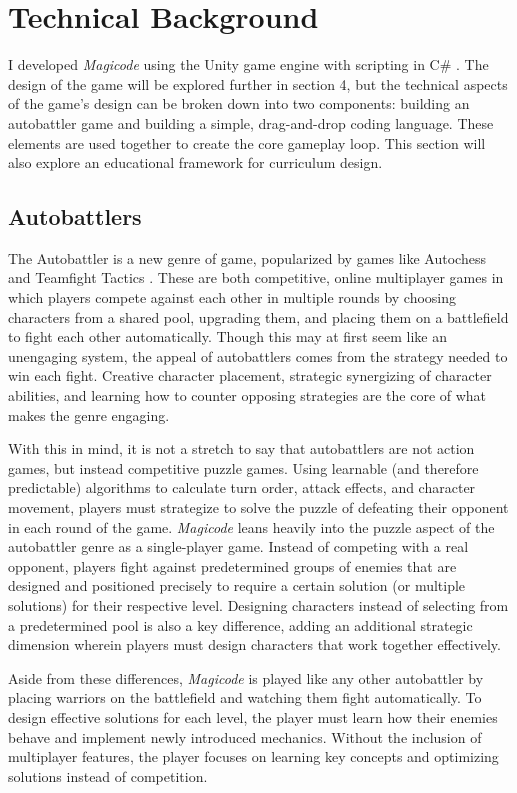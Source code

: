 \documentclass[10pt,twocolumn]{article}
\begin{document}
\section{Technical Background}
I developed \textit{Magicode} using the Unity game engine with scripting in C\# \cite{unity-website}. The design of the game will be explored further in section 4, but the technical aspects of the game’s design can be broken down into two components: building an autobattler game and building a simple, drag-and-drop coding language. These elements are used together to create the core gameplay loop. This section will also explore an educational framework for curriculum design.

\subsection{Autobattlers}
The Autobattler is a new genre of game, popularized by games like Autochess \cite{autochess-steam} and Teamfight Tactics \cite{tft}. These are both competitive, online multiplayer games in which players compete against each other in multiple rounds by choosing characters from a shared pool, upgrading them, and placing them on a battlefield to fight each other automatically. Though this may at first seem like an unengaging system, the appeal of autobattlers comes from the strategy needed to win each fight. Creative character placement, strategic synergizing of character abilities, and learning how to counter opposing strategies are the core of what makes the genre engaging.

With this in mind, it is not a stretch to say that autobattlers are not action games, but instead competitive puzzle games. Using learnable (and therefore predictable) algorithms to calculate turn order, attack effects, and character movement, players must strategize to solve the puzzle of defeating their opponent in each round of the game. \textit{Magicode} leans heavily into the puzzle aspect of the autobattler genre as a single-player game. Instead of competing with a real opponent, players fight against predetermined groups of enemies that are designed and positioned precisely to require a certain solution (or multiple solutions) for their respective level. Designing characters instead of selecting from a predetermined pool is also a key difference, adding an additional strategic dimension wherein players must design characters that work together effectively.

Aside from these differences, \textit{Magicode} is played like any other autobattler by placing warriors on the battlefield and watching them fight automatically. To design effective solutions for each level, the player must learn how their enemies behave and implement newly introduced mechanics. Without the inclusion of multiplayer features, the player focuses on learning key concepts and optimizing solutions instead of competition.
\end{document}
